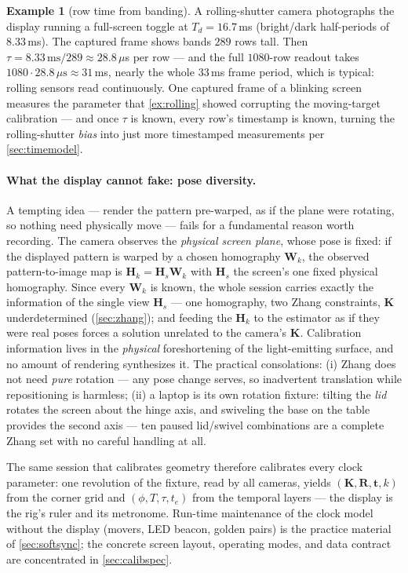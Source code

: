 \documentclass[11pt]{article}
\theoremstyle{definition}
\newtheorem{example}{Example}
\newcommand{\mat}[1]{\mathbf{#1}}
\newcommand{\vect}[1]{\mathbf{#1}}
\newcommand{\R}{\mat{R}}
\newcommand{\K}{\mat{K}}
\newcommand{\Hm}{\mat{H}}
\newcommand{\tv}{\vect{t}}
\begin{document}
\begin{example}[row time from banding]
\label{ex:banding}
A rolling-shutter camera photographs the display running a full-screen
toggle at $T_d=16.7$\,ms (bright/dark half-periods of $8.33$\,ms). The
captured frame shows bands $289$ rows tall. Then
$\tau = 8.33\,\text{ms}/289 \approx 28.8\,\mu$s per row --- and the full
$1080$-row readout takes $1080\cdot28.8\,\mu\text{s}\approx31$\,ms,
nearly the whole $33$\,ms frame period, which is typical: rolling
sensors read continuously. One captured frame of a blinking screen
measures the parameter that \autoref{ex:rolling} showed corrupting the
moving-target calibration --- and once $\tau$ is known, every row's
timestamp is known, turning the rolling-shutter \emph{bias} into just
more timestamped measurements per \autoref{sec:timemodel}.
\end{example}

\paragraph{What the display cannot fake: pose diversity.} A tempting
idea --- render the pattern pre-warped, as if the plane were rotating,
so nothing need physically move --- fails for a fundamental reason
worth recording. The camera observes the \emph{physical screen plane},
whose pose is fixed: if the displayed pattern is warped by a chosen
homography $\mat{W}_k$, the observed pattern-to-image map is
$\Hm_k = \Hm_s \mat{W}_k$ with $\Hm_s$ the screen's one fixed
physical homography. Since every $\mat{W}_k$ is known, the whole
session carries exactly the information of the single view $\Hm_s$
--- one homography, two Zhang constraints, $\K$ underdetermined
(\autoref{sec:zhang}); and feeding the $\Hm_k$ to the estimator as if
they were real poses forces a solution unrelated to the camera's
$\K$. Calibration information lives in the \emph{physical}
foreshortening of the light-emitting surface, and no amount of
rendering synthesizes it. The practical consolations: (i) Zhang does
not need \emph{pure} rotation --- any pose change serves, so
inadvertent translation while repositioning is harmless; (ii) a laptop
is its own rotation fixture: tilting the \emph{lid} rotates the screen
about the hinge axis, and swiveling the base on the table provides the
second axis --- ten paused lid/swivel combinations are a complete
Zhang set with no careful handling at all.

The same session that calibrates geometry therefore calibrates every
clock parameter: one revolution of the fixture, read by all cameras,
yields $(\K,\R,\tv,k)$ from the corner grid and
$(\phi,T,\tau,t_e)$ from the temporal layers --- the display is the
rig's ruler and its metronome. Run-time maintenance of the clock model
without the display (movers, LED beacon, golden pairs) is the practice
material of \autoref{sec:softsync}; the concrete screen layout, operating
modes, and data contract are concentrated in \autoref{sec:calibspec}.
\end{document}
